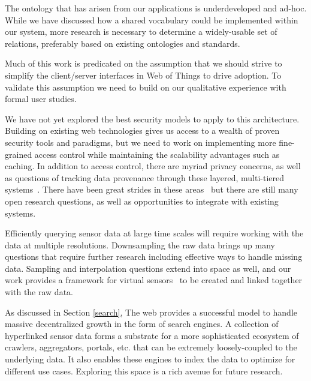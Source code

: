 \documentclass{acm_proc_article-sp}
\begin{document}
The ontology that has arisen from our applications is underdeveloped and
ad-hoc. While we have discussed how a shared vocabulary could be implemented
within our system, more research is necessary to determine a widely-usable set
of relations, preferably based on existing ontologies and standards.

Much of this work is predicated on the assumption that we should strive to
simplify the client/server interfaces in Web of Things to drive adoption. To
validate this assumption we need to build on our qualitative experience with
formal user studies.

We have not yet explored the best security models to apply to this
architecture. Building on existing web technologies gives us access to a wealth
of proven security tools and paradigms, but we need to work on implementing
more fine-grained access control while maintaining the scalability advantages
such as caching. In addition to access control, there are myriad privacy
concerns, as well as questions of tracking data provenance through these
layered, multi-tiered systems~\cite{balazinska2007}. There have been great
strides in these areas~\cite{de2014openpds} but there are still many open
research questions, as well as opportunities to integrate with existing
systems.

Efficiently querying sensor data at large time scales will require working with
the data at multiple resolutions. Downsampling the raw data brings up many
questions that require further research including effective ways to handle
missing data. Sampling and interpolation questions extend into space as well,
and our work provides a framework for virtual sensors~\cite{sarkar2014no} to be
created and linked together with the raw data.

As discussed in Section \ref{search}, The web provides a successful model to
handle massive decentralized growth in the form of search engines. A collection
of hyperlinked sensor data forms a substrate for a more sophisticated ecosystem
of crawlers, aggregators, portals, etc. that can be extremely loosely-coupled
to the underlying data. It also enables these engines to index the data to
optimize for different use cases. Exploring this space is a rich avenue for
future research.
\end{document}

